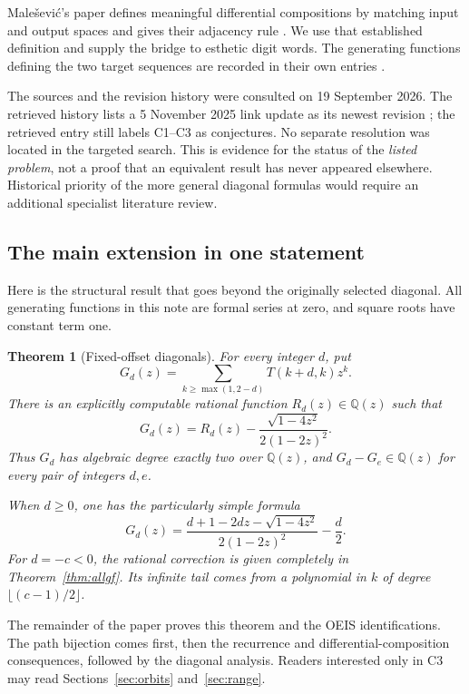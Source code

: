 \documentclass[11pt,letterpaper]{article}
\numberwithin{equation}{section}
\newtheorem{theorem}{Theorem}[section]
\theoremstyle{definition}
\newcommand{\Q}{\mathbb Q}
\begin{document}
Male\v sevi\'c's paper defines meaningful differential compositions by
matching input and output spaces and gives their adjacency rule
\cite{mal}.  We use that established definition and supply the bridge to
esthetic digit words.  The generating functions defining the two target
sequences are recorded in their own entries \cite{oeis182555,oeis206603}.

The sources and the revision history were consulted on 19 September
2026.  The retrieved history lists a 5 November 2025 link update as its
newest revision \cite{oeishistory}; the retrieved entry still labels C1--C3
as conjectures.  No separate resolution was located in the targeted
search.  This is evidence for the status of the \emph{listed problem},
not a proof that an equivalent result has never appeared elsewhere.
Historical priority of the more general diagonal formulas would require
an additional specialist literature review.

\subsection{The main extension in one statement}
Here is the structural result that goes beyond the originally selected
diagonal.  All generating functions in this note are formal series at
zero, and square roots have constant term one.

\begin{theorem}[Fixed-offset diagonals]\label{thm:overview}
For every integer $d$, put
\[
G_d(z)=\sum_{k\ge\max(1,2-d)}T(k+d,k)z^k.
\]
There is an explicitly computable rational function $R_d(z)\in\Q(z)$ such
that
\begin{equation}\label{eq:commonpart}
G_d(z)=R_d(z)-\frac{\sqrt{1-4z^2}}{2(1-2z)^2}.
\end{equation}
Thus $G_d$ has algebraic degree exactly two over $\Q(z)$, and
$G_d-G_e\in\Q(z)$ for every pair of integers $d,e$.

When $d\ge0$, one has the particularly simple formula
\begin{equation}\label{eq:positiveG}
G_d(z)=\frac{d+1-2dz-\sqrt{1-4z^2}}{2(1-2z)^2}-\frac d2.
\end{equation}
For $d=-c<0$, the rational correction is given completely in
Theorem~\ref{thm:allgf}.  Its infinite tail comes from a polynomial in $k$
of degree $\lfloor(c-1)/2\rfloor$.
\end{theorem}

The remainder of the paper proves this theorem and the OEIS
identifications.  The path bijection comes first, then the recurrence
and differential-composition consequences, followed by the diagonal
analysis.  Readers interested only in C3 may read
Sections~\ref{sec:orbits} and~\ref{sec:range}.
\end{document}
